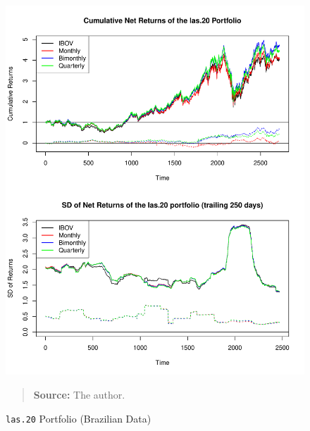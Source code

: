 \documentclass[preprint, doubleblind, authoryear,10pt]{elsarticle}
\begin{document}
\begin{figure}[htpb]
\centering
\footnotesize
\caption{\texttt{las.20} Portfolio (Brazilian Data)}
\label{fig:ibov:las.20}
\includegraphics[width=.95\linewidth]{./figs/IBOV-retac-las-20.pdf}
\begin{quote}
\textbf{Source:} The author.
\end{quote}
\end{figure}


\clearpage





\clearpage

\end{document}
